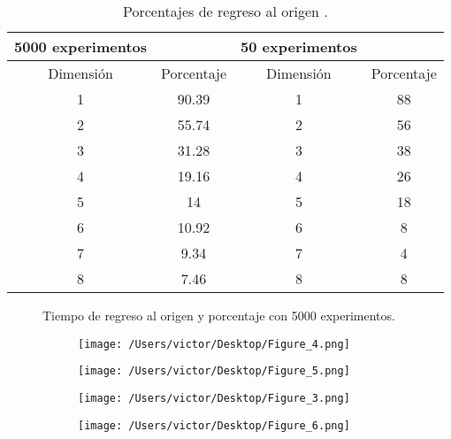 \documentclass{article}
\begin{document}
\begin{table}
\centering
\caption{Porcentajes de regreso al origen .}
\label{fig:cuadro1}
\begin{tabular}{|cc|cc|}
\hline
5000 experimentos && 50 experimentos &  \\
\hline
Dimensión & Porcentaje & Dimensión & Porcentaje\\
\hline
1& 90.39&1& 88\\
2&55.74&2&56\\
3&31.28&3&38\\
4&19.16&4&26\\
5&14&5&18\\
6&10.92&6&8\\
7&9.34&7&4\\
8&7.46&8&8\\
\hline
\end{tabular}
\end{table}




\begin{figure}
 	\centering
 	\caption{Tiempo de regreso al origen y porcentaje con 5000 experimentos.} 
	\label{fig:exp5000}
 	\begin{subfigure}[H]{0.45\linewidth}
 		\texttt{[image: /Users/victor/Desktop/Figure\_4.png]}
 	\end{subfigure}
 	\begin{subfigure}[H]{0.45\linewidth}
 		\texttt{[image: /Users/victor/Desktop/Figure\_5.png]}
 	\end{subfigure}
	\caption{Tiempo de regreso al origen y porcentaje con 50 experimentos.} 
	\label{fig:exp50}
 	\begin{subfigure}[H]{0.45\linewidth}
 		\texttt{[image: /Users/victor/Desktop/Figure\_3.png]}
 	\end{subfigure}
	\begin{subfigure}[H]{0.45\linewidth}
 		\texttt{[image: /Users/victor/Desktop/Figure\_6.png]}
 	\end{subfigure}
 \end{figure}



\end{document}
